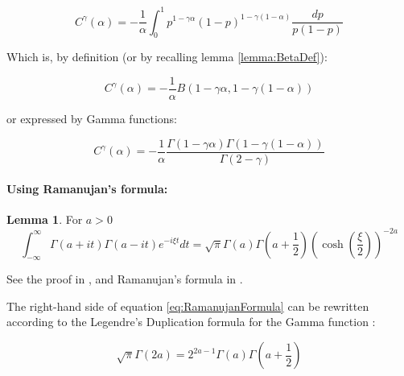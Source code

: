 \documentclass{article}
\theoremstyle{definition}
\newtheorem{lemma}{Lemma}[section]
\begin{document}
\begin{equation}
    C^\gamma(\alpha) = - \frac{1}{\alpha} \int_{0}^1
     p^{1-\gamma \alpha}
    \left ( 1-p \right )^{1-\gamma (1-\alpha)}
    \frac{dp}{p (1-p)}
\end{equation}

Which is, by definition (or by recalling lemma \ref{lemma:BetaDef}):

\begin{equation}
\boxed{
    C^\gamma(\alpha) = - \frac{1}{\alpha}
    B(1-\gamma \alpha, 1- \gamma (1-\alpha))
    }
\end{equation}

or expressed by Gamma functions:

\begin{equation}
\boxed{
    C^\gamma(\alpha) = - \frac{1}{\alpha}
    \frac{\Gamma(1-\gamma \alpha)\Gamma(1- \gamma (1-\alpha))}{\Gamma(2-\gamma)}
    }
\end{equation}


\paragraph{Using Ramanujan’s formula:}

\begin{lemma}
    For $a>0$
    \begin{equation}
    \label{eq:RamanujanFormula}
        \int_{-\infty}^\infty \Gamma(a+i t) \Gamma(a-i t) e^{-i \xi t} d t = 
        \sqrt{\pi} \Gamma(a) \Gamma
        \left (
        a + \frac{1}{2}
        \right  )
        \left (
        \cosh \left ( \frac{\xi}{2} \right )
        \right )^{-2 a}
    \end{equation}

    See the proof in \cite{arxiv:Ramanujan}, and Ramanujan’s formula in \cite{paper:RamanujanOriginal,book:HigherTranscendentalFunctions}.
    
\end{lemma}



The right-hand side of equation \eqref{eq:RamanujanFormula} can be rewritten according to the Legendre's Duplication formula for the Gamma function \cite{book:ClassicalTopicsInComplexFunctionTheory,arxiv:Ramanujan}:

\begin{equation}
    \sqrt{\pi} \Gamma(2 a) = 2^{2 a -1} \Gamma(a)  
    \Gamma \left ( a + \frac{1}{2} \right )
\end{equation}
\end{document}
